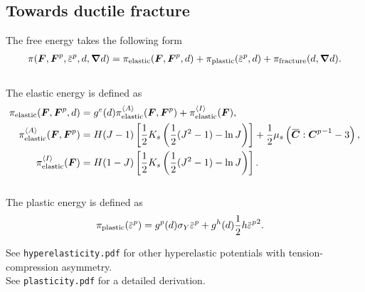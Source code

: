 \subsection{Towards ductile fracture}

\subsectioncover

\begin{frame}{}
The free energy takes the following form
\begin{align}
    \pi(\defgrad, \defgrad^p, \plasticstrain, d, \grad d) = \pi_\elastic(\defgrad, \defgrad^p, d) + \pi_\plastic(\plasticstrain, d) + \pi_\fracture(d, \grad d).
\end{align} \\
The elastic energy is defined as
\begin{subequations}
\begin{align}
    \pi_\elastic(\defgrad, \defgrad^p, d) &= g^e(d) \pi_\elastic^\activeenergy(\defgrad, \defgrad^p) + \pi_\elastic^\inactiveenergy(\defgrad), \\
    \pi_\elastic^\activeenergy(\defgrad, \defgrad^p) &= H(J-1) \left[ \dfrac{1}{2} K_s \left( \dfrac{1}{2} (J^2-1) - \ln{J} \right) \right] + \dfrac{1}{2} \mu_s \left( \overbar{\bs{C}} : {\bs{C}^p}^{-1} - 3 \right), \\
    \pi_\elastic^\inactiveenergy(\defgrad) &= H(1-J) \left[ \dfrac{1}{2} K_s \left( \dfrac{1}{2} (J^2-1) - \ln{J} \right) \right].
\end{align}
\end{subequations} \\
The plastic energy is defined as
\begin{align}
    \pi_\plastic(\plasticstrain) &= g^p(d) \sigma_Y \plasticstrain + g^h(d) \dfrac{1}{2} h \plasticstrain^2.
\end{align}
\begin{exampleblock}{}
    See \texttt{hyperelasticity.pdf} for other hyperelastic potentials with tension-compression asymmetry. \\
    See \texttt{plasticity.pdf} for a detailed derivation.
\end{exampleblock}
\end{frame}

